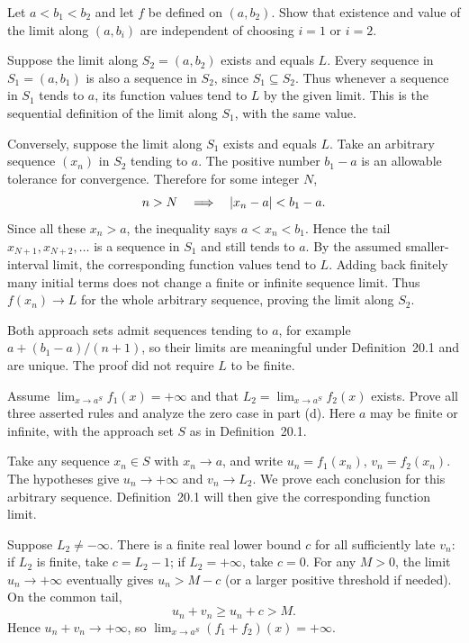 \goal Let $a<b_1<b_2$ and let $f$ be defined on $(a,b_2)$.
Show that existence and value of the limit along $(a,b_i)$
are independent of choosing $i=1$ or $i=2$.

Suppose the limit along $S_2=(a,b_2)$ exists and equals $L$.
Every sequence in $S_1=(a,b_1)$ is also a sequence in $S_2$,
since $S_1\subseteq S_2$. Thus whenever a sequence in $S_1$
tends to $a$, its function values tend to $L$ by the given
limit. This is the sequential definition of the limit along
$S_1$, with the same value.

Conversely, suppose the limit along $S_1$ exists and equals $L$.
Take an arbitrary sequence $(x_n)$ in $S_2$ tending to $a$.
The positive number $b_1-a$ is an allowable tolerance for
convergence. Therefore for some integer $N$,
\[
 n>N\quad\Longrightarrow\quad
 \left|x_n-a\right|<b_1-a.
\]
Since all these $x_n>a$, the inequality says $a<x_n<b_1$.
Hence the tail $x_{N+1},x_{N+2},\ldots$ is a sequence in
$S_1$ and still tends to $a$. By the assumed smaller-interval
limit, the corresponding function values tend to $L$.
Adding back finitely many initial terms does not change a
finite or infinite sequence limit. Thus $f(x_n)\to L$ for the
whole arbitrary sequence, proving the limit along $S_2$.

Both approach sets admit sequences tending to $a$, for example
$a+(b_1-a)/(n+1)$, so their limits are meaningful under
Definition~20.1 and are unique. The proof did not require $L$
to be finite.

\goal Assume $\lim_{x\to a^S}f_1(x)=+\infty$ and that
$L_2=\lim_{x\to a^S}f_2(x)$ exists. Prove all three asserted
rules and analyze the zero case in part (d).
Here $a$ may be finite or infinite, with the approach set $S$
as in Definition~20.1.

Take any sequence $x_n\in S$ with $x_n\to a$, and write
$u_n=f_1(x_n)$, $v_n=f_2(x_n)$. The hypotheses give
$u_n\to+\infty$ and $v_n\to L_2$. We prove each conclusion
for this arbitrary sequence. Definition~20.1 will then give
the corresponding function limit.

Suppose $L_2\ne-\infty$. There is a finite real lower bound
$c$ for all sufficiently late $v_n$: if $L_2$ is finite, take
$c=L_2-1$; if $L_2=+\infty$, take $c=0$.
For any $M>0$, the limit $u_n\to+\infty$ eventually gives
$u_n>M-c$ (or a larger positive threshold if needed).
On the common tail,
\[
 u_n+v_n\ge u_n+c>M.
\]
Hence $u_n+v_n\to+\infty$, so
$\lim_{x\to a^S}(f_1+f_2)(x)=+\infty$.

